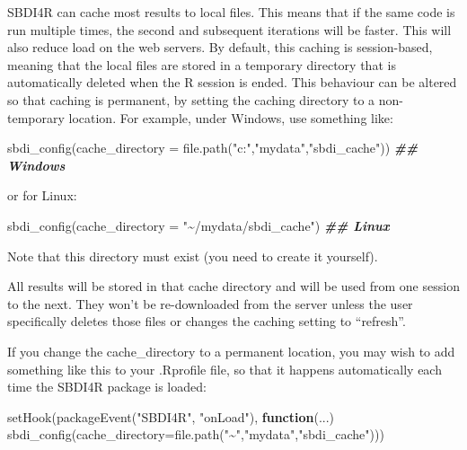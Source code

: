 \documentclass[
  10pt,
]{article}
\newenvironment{Shaded}{\begin{snugshade}}{\end{snugshade}}
\newcommand{\AttributeTok}[1]{\textcolor[rgb]{0.77,0.63,0.00}{#1}}
\newcommand{\ControlFlowTok}[1]{\textcolor[rgb]{0.13,0.29,0.53}{\textbf{#1}}}
\newcommand{\DocumentationTok}[1]{\textcolor[rgb]{0.56,0.35,0.01}{\textbf{\textit{#1}}}}
\newcommand{\FunctionTok}[1]{\textcolor[rgb]{0.00,0.00,0.00}{#1}}
\newcommand{\NormalTok}[1]{#1}
\newcommand{\StringTok}[1]{\textcolor[rgb]{0.31,0.60,0.02}{#1}}
\begin{document}
SBDI4R can cache most results to local files. This means that if the
same code is run multiple times, the second and subsequent iterations
will be faster. This will also reduce load on the web servers. By
default, this caching is session-based, meaning that the local files are
stored in a temporary directory that is automatically deleted when the R
session is ended. This behaviour can be altered so that caching is
permanent, by setting the caching directory to a non-temporary location.
For example, under Windows, use something like:

\begin{Shaded}
\begin{Highlighting}[]
\FunctionTok{sbdi\_config}\NormalTok{(}\AttributeTok{cache\_directory =} \FunctionTok{file.path}\NormalTok{(}\StringTok{"c:"}\NormalTok{,}\StringTok{"mydata"}\NormalTok{,}\StringTok{"sbdi\_cache"}\NormalTok{)) }\DocumentationTok{\#\# Windows}
\end{Highlighting}
\end{Shaded}

or for Linux:

\begin{Shaded}
\begin{Highlighting}[]
\FunctionTok{sbdi\_config}\NormalTok{(}\AttributeTok{cache\_directory =} \StringTok{"\textasciitilde{}/mydata/sbdi\_cache"}\NormalTok{) }\DocumentationTok{\#\# Linux}
\end{Highlighting}
\end{Shaded}

Note that this directory must exist (you need to create it yourself).

All results will be stored in that cache directory and will be used from
one session to the next. They won't be re-downloaded from the server
unless the user specifically deletes those files or changes the caching
setting to ``refresh''.

If you change the cache\_directory to a permanent location, you may wish
to add something like this to your .Rprofile file, so that it happens
automatically each time the SBDI4R package is loaded:

\begin{Shaded}
\begin{Highlighting}[]
\FunctionTok{setHook}\NormalTok{(}\FunctionTok{packageEvent}\NormalTok{(}\StringTok{"SBDI4R"}\NormalTok{, }\StringTok{"onLoad"}\NormalTok{), }
        \ControlFlowTok{function}\NormalTok{(...) }\FunctionTok{sbdi\_config}\NormalTok{(}\AttributeTok{cache\_directory=}\FunctionTok{file.path}\NormalTok{(}\StringTok{"\textasciitilde{}"}\NormalTok{,}\StringTok{"mydata"}\NormalTok{,}\StringTok{"sbdi\_cache"}\NormalTok{)))}
\end{Highlighting}
\end{Shaded}
\end{document}
